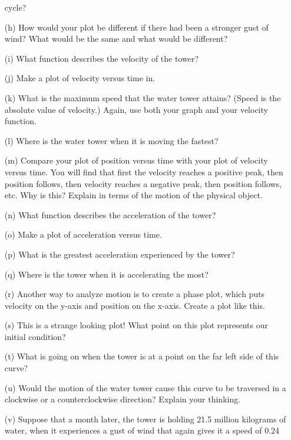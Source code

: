 \begin{problem}
\begin{enumerate}
            cycle?
        \item[(h)] How would your plot be different if there had been a stronger gust of
            wind?  What would be the same and what would be different?
        \item[(i)] What function describes the velocity of the tower?
        \item[(j)] Make a plot of velocity versus
            time in.
        \item[(k)] What is the maximum speed that the water tower attains?  (Speed is the
            absolute value of velocity.) Again, use both your graph and your velocity
            function.
        \item[(l)] Where is the water tower when it is moving the fastest?
        \item[(m)] Compare your plot of position versus time with your plot of velocity
            versus time.  You will find that first the velocity reaches a positive peak,
            then position follows, then velocity reaches a negative peak, then position
            follows, etc.  Why is this?  Explain in terms of the motion of the physical
            object.
        \item[(n)] What function describes the acceleration of the tower?
        \item[(o)] Make a plot of acceleration versus
            time.
        \item[(p)] What is the greatest acceleration experienced by the tower?
        \item[(q)] Where is the tower when it is accelerating the most?
        \item[(r)] Another way to analyze motion is to create a phase plot, which puts
            velocity on the y-axis and position on the x-axis.  Create a plot like this.
        \item[(s)] This is a strange looking plot!  What point on this plot represents our
            initial condition?  
        \item[(t)] What is going on when the tower is at a point on the far left side of this
            curve?
        \item[(u)] Would the motion of the water tower cause this curve to be traversed in a
            clockwise or a counterclockwise direction?  Explain your thinking.
        \item[(v)] Suppose that a month later, the tower is holding 21.5 million kilograms of
            water, when it experiences a gust of wind that again gives it a speed of 0.24

\end{enumerate}
\end{problem}
